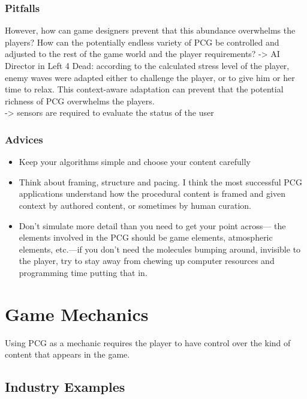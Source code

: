 \documentclass[MGS,Master,english]{twbook}%
\begin{document}
\subsubsection{Pitfalls}
\cite{pcg::shortHistoryOfDynamicAndPCG}
However, how can game designers prevent that this abundance overwhelms the players? How can the potentially endless variety of PCG be controlled and adjusted to the rest of the game world and the player requirements? -> AI Director in Left 4 Dead: according to the calculated stress level of the player, enemy waves were adapted either to challenge the player, or to give him or her time to relax. This context-aware adaptation can prevent that the potential richness of PCG overwhelms the players.\\
-> sensors are required to evaluate the status of the user

\subsubsection{Advices}
\cite{pcg::book} 
\begin{itemize}
	\item Keep your algorithms simple and choose your content carefully 
	\item Think about framing, structure and pacing. I think the most successful PCG applications understand how the procedural content	is framed and given context by authored content, or sometimes by human curation.
	\item Don’t simulate more detail than you need to get your point across— the elements involved in the PCG should be game elements, atmospheric elements, etc.—if you don’t need the molecules bumping around, invisible to the	player, try to stay away from chewing up computer resources and programming time putting that in.
\end{itemize}


\section{Game Mechanics}
Using PCG as a mechanic requires the player to have control over the kind of content that appears in the game.\cite{pcg::endlessWeb}
\subsection{Industry Examples}
\end{document}
